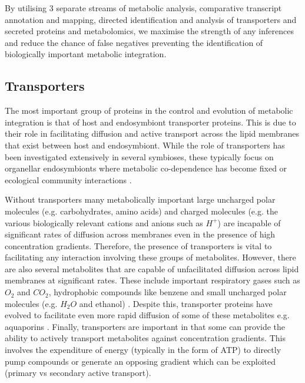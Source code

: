 By utilising 3 separate streams of metabolic analysis, comparative transcript annotation
and mapping, directed identification and analysis of transporters and secreted
proteins and metabolomics, we maximise the strength of any inferences and 
reduce the chance of false negatives preventing the identification of biologically
important metabolic integration.



\subsection{Transporters}

The most important group of proteins in the control and evolution
of metabolic integration is that of host and endosymbiont transporter proteins.
This is due to their role in facilitating diffusion and active transport
across the lipid membranes that exist between host and endosymbiont.
While the role of transporters has been investigated extensively in 
several symbioses, these typically focus on organellar endosymbionts where
metabolic co-dependence has become fixed \citep{Yuan1994,Tyra2007,Huang2007,Li2010a} 
or ecological community interactions 
\citep{Richards2013,Hirner2006,Bachmann2013,Oldroyd2009}.


Without transporters many metabolically important 
large uncharged polar molecules (e.g. carbohydrates, amino acids)
and charged molecules (e.g. the various biologically relevant cations and anions such
as \(H^{+}\)) are incapable of significant rates of diffusion 
across membranes even in the presence of high concentration gradients. 
Therefore, the presence of transporters is vital to facilitating
any interaction involving these groups of metabolites. 
However, there are also several metabolites that are capable 
of unfacilitated diffusion across lipid membranes at significant rates.
These include important respiratory gases such as \(O_{2}\) and \(CO_2\),
hydrophobic compounds like benzene and small uncharged polar molecules
(e.g. \(H_2O\) and ethanol) \citep{cooper2013the,alberts2015molecular}.  
Despite this, transporter proteins have evolved to facilitate
even more rapid diffusion of some of these metabolites e.g. aquaporins
\citep{Agre1993}.  
Finally, transporters are important in that some can provide the ability
to actively transport metabolites against concentration gradients. 
This involves the expenditure of energy (typically in the form of ATP)
to directly pump compounds or generate an opposing gradient which can be
exploited (primary vs secondary active transport). 


